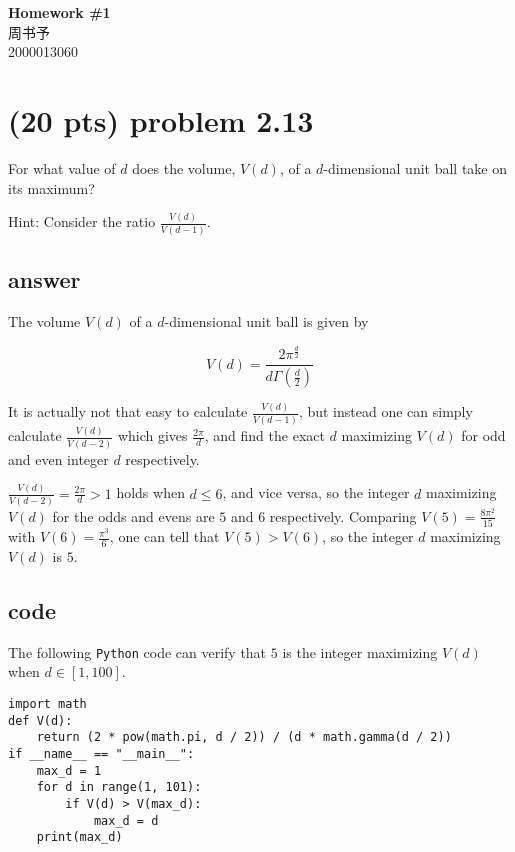 \documentclass[12pt]{article}%
\newcommand{\hwid}{1}			%
\newcommand{\name}{周书予} 		%
\newcommand{\id}{2000013060} 	%
\begin{document}
    \pagestyle{fancy}
    \chead{}

    \begin{center}
        {\LARGE \bf Homework \#\hwid}\\
        {\Large \name}\\
        {\Large \id}\\
    \end{center}
    
\section{(20 pts) problem 2.13}
For what value of $d$ does the volume, $V(d)$, of a $d$-dimensional unit ball take on its maximum?

Hint: Consider the ratio $\frac{V(d)}{V(d-1)}$.
\subsection*{answer}

The volume $V(d)$ of a $d$-dimensional unit ball is given by

$$V(d) = \frac{2\pi^{\frac d2}}{d\Gamma(\frac d2)}$$

It is actually not that easy to calculate $\frac{V(d)}{V(d-1)}$, but instead one can simply calculate $\frac{V(d)}{V(d-2)}$ which gives $\frac{2\pi}{d}$, and find the exact $d$ maximizing $V(d)$ for odd and even integer $d$ respectively.

$\frac{V(d)}{V(d-2)} = \frac{2\pi}{d} > 1$ holds when $d \le 6$, and vice versa, so the integer $d$ maximizing $V(d)$ for the odds and evens are $5$ and $6$ respectively. Comparing $V(5) = \frac{8\pi^2}{15}$ with $V(6) = \frac{\pi^3}{6}$, one can tell that $V(5) > V(6)$, so the integer $d$ maximizing $V(d)$ is $5$.

\subsection*{code}
The following \texttt{Python} code can verify that $5$ is the integer maximizing $V(d)$ when $d \in [1, 100]$.

\begin{verbatim}
import math
def V(d):
    return (2 * pow(math.pi, d / 2)) / (d * math.gamma(d / 2))
if __name__ == "__main__":
    max_d = 1
    for d in range(1, 101):
        if V(d) > V(max_d):
            max_d = d
    print(max_d)
\end{verbatim}
\end{document}
